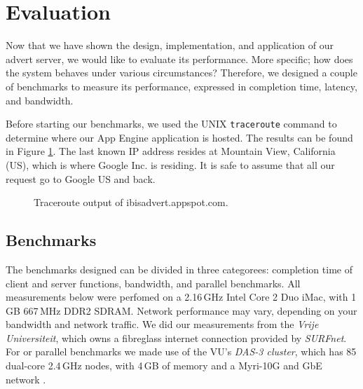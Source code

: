 \section{Evaluation}
\label{evaluation}
Now that we have shown the design, implementation, and application of our advert
server, we would like to evaluate its performance. More specific; how does the
system behaves under various circumstances? Therefore, we designed a couple of
benchmarks to measure its performance, expressed in completion time, latency,
and bandwidth.

Before starting our benchmarks, we used the UNIX \texttt{traceroute} command to
determine where our App Engine application is hosted. The results can be found in
Figure \ref{tracert}. The last known IP address resides at Mountain View,
California (US), which is where Google Inc. is residing. It is safe to assume
that all our request go to Google US and back.

\begin{figure}[h,b] %
\begin{center}
\caption{Traceroute output of ibisadvert.appspot.com.\label{tracert}}
\end{center}
\end{figure}

\subsection{Benchmarks}
The benchmarks designed can be divided in three categorees: completion time of
client and server functions, bandwidth, and parallel benchmarks. All measurements
below were perfomed on a 2.16\,GHz Intel Core 2 Duo iMac, with 1\,GB 667\,MHz
DDR2 SDRAM. Network performance may vary, depending on your bandwidth and network
traffic. We did our measurements from the \emph{Vrije Universiteit}, which owns a
fibreglass internet connection provided by \emph{SURFnet}. For or parallel
benchmarks we made use of the VU's \emph{DAS-3 cluster}, which has 85 dual-core
2.4\,GHz nodes, with 4\,GB of memory and a Myri-10G and GbE network \cite{das3-www}.

